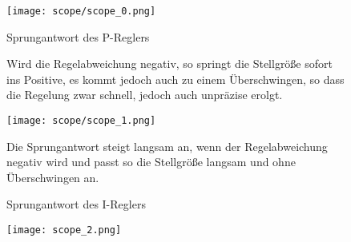 \documentclass[a4paper]{article}
\begin{document}

\begin{figure}[H]
	\begin{minipage}[t]{.48\linewidth}
		\begin{center}
			\texttt{[image: scope/scope\_0.png]}
			\caption{Sprungantwort des P-Reglers}
		\end{center}
		Wird die Regelabweichung negativ, so springt die Stellgröße sofort ins Positive, es kommt jedoch auch zu einem Überschwingen, so dass die Regelung zwar schnell, jedoch auch unpräzise erolgt.
	\end{minipage}%
	\hspace{.04\linewidth}
	\begin{minipage}[t]{.48\linewidth}
		\begin{center}
			\texttt{[image: scope/scope\_1.png]}
			\caption{Sprungantwort des I-Reglers}
		\end{center}
		Die Sprungantwort steigt langsam an, wenn der Regelabweichung negativ wird und passt so die Stellgröße langsam und ohne Überschwingen an.
	\end{minipage}%
\end{figure}


\begin{figure}[H]
	\centering
	\texttt{[image: scope\_2.png]}
\end{figure}

\end{document}
